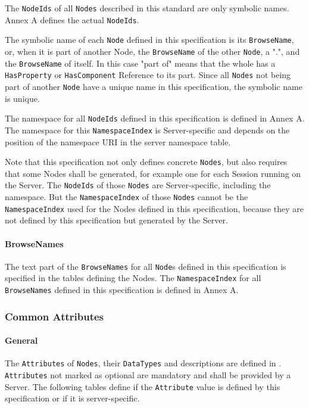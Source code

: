 The \texttt{NodeIds} of all \texttt{Nodes} described in this standard are only symbolic names. Annex A defines the actual \texttt{NodeIds}.

The symbolic name of each \texttt{Node} defined in this specification is its \texttt{BrowseName}, or, when it is part of another Node, the \texttt{BrowseName} of the other \texttt{Node}, a ".", and the \texttt{BrowseName} of itself. In this case "part of" means that the whole has a \texttt{HasProperty} or \texttt{HasComponent} Reference to its part. Since all \texttt{Nodes} not being part of another \texttt{Node} have a unique name in this specification, the symbolic name is unique.

The namespace for all \texttt{NodeIds} defined in this specification is defined in Annex A. The namespace for this \texttt{NamespaceIndex} is Server-specific and depends on the position of the namespace URI in the server namespace table.

Note that this specification not only defines concrete \texttt{Nodes}, but also requires that some Nodes shall be generated, for example one for each Session running on the Server. The \texttt{NodeIds} of those \texttt{Nodes} are Server-specific, including the namespace. But the \texttt{NamespaceIndex} of those \texttt{Nodes} cannot be the \texttt{NamespaceIndex} used for the Nodes defined in this specification, because they are not defined by this specification but generated by the Server.

\paragraph{BrowseNames}
The text part of the \texttt{BrowseNames} for all \texttt{Node}s defined in this specification is specified in the tables defining the Nodes. The \texttt{NamespaceIndex} for all \texttt{BrowseNames} defined in this specification is defined in Annex A.

\subsubsection{Common Attributes}

\paragraph{General}
The \texttt{Attributes} of \texttt{Nodes}, their \texttt{DataTypes} and descriptions are defined in \cite{UAPart3}. \texttt{Attributes} not marked as optional are mandatory and shall be provided by a Server. The following tables define if the \texttt{Attribute} value is defined by this specification or if it is server-specific.


